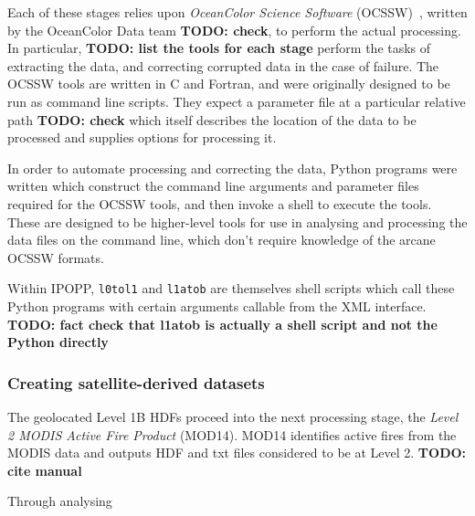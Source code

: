 Each of these stages relies upon \textit{OceanColor Science Software} (OCSSW)~\cite{ocssw}, written by the OceanColor Data team \textbf{TODO: check}, to perform the actual processing.
In particular, \textbf{TODO: list the tools for each stage} perform the tasks of extracting the data, and correcting corrupted data in the case of failure.
The OCSSW tools are written in C and Fortran, and were originally designed to be run as command line scripts.
They expect a parameter file at a particular relative path \textbf{TODO: check} which itself describes the location of the data to be processed and supplies options for processing it.

In order to automate processing and correcting the data, Python programs were written which construct the command line arguments and parameter files required for the OCSSW tools, and then invoke a shell to execute the tools.
These are designed to be higher-level tools for use in analysing and processing the data files on the command line, which don't require knowledge of the arcane OCSSW formats.

Within IPOPP, \texttt{l0tol1} and \texttt{l1atob} are themselves shell scripts which call these Python programs with certain arguments callable from the XML interface.
\textbf{TODO: fact check that l1atob is actually a shell script and not the Python directly}

\subsubsection{Creating satellite-derived datasets}

The geolocated Level 1B HDFs proceed into the next processing stage, the \textit{Level 2 MODIS Active Fire Product} (MOD14).
MOD14 identifies active fires from the MODIS data and outputs HDF and txt files considered to be at Level 2. \textbf{TODO: cite manual}


Through analysing







